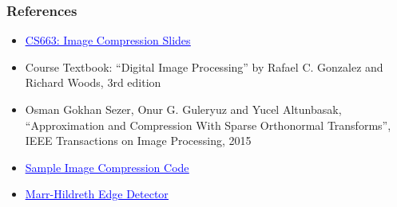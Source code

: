 \documentclass[Serif, 10pt, brown]{beamer}
\theoremstyle{example}
\theoremstyle{plain}
\begin{document}
\begin{frame}
	\frametitle{References}
	\begin{itemize}
		\item \href{https://docs.google.com/presentation/d/1-8xCg7o8Vtc9ghJf6y1Nkq9-TV0qSNfX/edit?usp=sharing&ouid=115909013767952805958&rtpof=true&sd=true}{\textcolor{blue}{\underline{CS663: Image Compression Slides}}}
		\item Course Textbook: ``Digital Image Processing'' by Rafael C. Gonzalez and Richard Woods, 3rd edition
		\item Osman Gokhan Sezer, Onur G. Guleryuz and Yucel Altunbasak, ``Approximation and Compression With Sparse Orthonormal Transforms'', IEEE Transactions on Image Processing, 2015
		\item \href{https://github.com/jeremyfell/image-compression/blob/master/image-compression.py}{\textcolor{blue}{\underline{Sample Image Compression Code}}}
		\item \href{https://github.com/adl1995/edge-detectors/blob/master/marr-hildreth-edge.py}{\textcolor{blue}{\underline{Marr-Hildreth Edge Detector}}}
	\end{itemize}
\end{frame}
\end{document}
